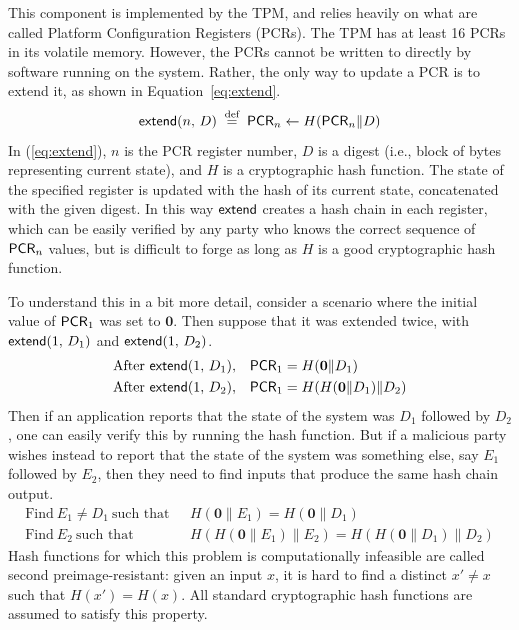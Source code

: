 \documentclass[11pt]{article}
\newcommand{\pcr}[1]{\ms{PCR}_{#1}}
\newcommand{\extend}[2]{\ms{extend}(#1,\, #2)}
\begin{document}
This component is implemented by the TPM, and relies heavily on what are called Platform Configuration Registers (PCRs). The TPM has at least 16 PCRs in its volatile memory. However, the PCRs cannot be written to directly by software running on the system. Rather, the only way to update a PCR is to extend it, as shown in Equation~\ref{eq:extend}.
\begin{equation}
\label{eq:extend}
\extend{n}{D} \;\stackrel{\text{def}}{=}\; \pcr{n} \leftarrow H(\pcr{n} \| D)
\end{equation}
In (\ref{eq:extend}), $n$ is the PCR register number, $D$ is a digest (i.e., block of bytes representing current state), and $H$ is a cryptographic hash function. The state of the specified register is updated with the hash of its current state, concatenated with the given digest. In this way $\mathsf{extend}$ creates a hash chain in each register, which can be easily verified by any party who knows the correct sequence of $\pcr{n}$ values, but is difficult to forge as long as $H$ is a good cryptographic hash function.

To understand this in a bit more detail, consider a scenario where the initial value of $\pcr{1}$ was set to $\mathbf{0}$. Then suppose that it was extended twice, with $\extend{1}{D_1}$ and $\extend{1}{D_2}$.
\begin{align*}
\text{After}~\extend{1}{D_1},\ \ \  & \pcr{1} = H(\mathbf{0} \| D_1) \\
\text{After}~\extend{1}{D_2},\ \ \  & \pcr{1} = H(H(\mathbf{0} \| D_1) \| D_2)
\end{align*}
Then if an application reports that the state of the system was $D_1$ followed by $D_2$, one can easily verify this by running the hash function. But if a malicious party wishes instead to report that the state of the system was something else, say $E_1$ followed by $E_2$, then they need to find inputs that produce the same hash chain output.
\begin{align*}
\text{Find}~E_1 \neq D_1~\text{such that}\ \ \  & H(\mathbf{0} \| E_1) = H(\mathbf{0} \| D_1) \\
\text{Find}~E_2~\text{such that}\ \ \  & H(H(\mathbf{0} \| E_1) \| E_2) = H(H(\mathbf{0} \| D_1) \| D_2)
\end{align*}
Hash functions for which this problem is computationally infeasible are called second preimage-resistant: given an input $x$, it is hard to find a distinct $x' \neq x$ such that $H(x') = H(x)$. All standard cryptographic hash functions are assumed to satisfy this property.
\end{document}
